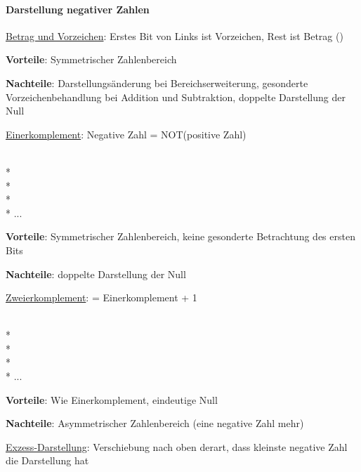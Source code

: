 \paragraph{Darstellung negativer Zahlen}
\begin{enumeration}
	\item \underline{Betrag und Vorzeichen}: Erstes Bit von Links ist Vorzeichen, Rest ist Betrag ()
	\begin{items}
		\item \textbf{Vorteile}: Symmetrischer Zahlenbereich
		\item \textbf{Nachteile}: Darstellungsänderung bei Bereichserweiterung, gesonderte Vorzeichenbehandlung bei Addition und Subtraktion, doppelte Darstellung der Null
	\end{items}

	\item \underline{Einerkomplement}: Negative Zahl = NOT(positive Zahl)
	\begin{center}
		 \quad {} \\*
		 \quad {} \\*
		 \quad {} \\*
		 \quad {} \\*
		...
	\end{center}
	\begin{items}
		\item \textbf{Vorteile}: Symmetrischer Zahlenbereich, keine gesonderte Betrachtung des ersten Bits
		\item \textbf{Nachteile}: doppelte Darstellung der Null
	\end{items}

	\item \underline{Zweierkomplement}: = Einerkomplement + 1
	\begin{center}
		 \quad {} \\*
		 \quad {} \\*
		 \quad {} \\*
		 \quad {} \\*
		...
	\end{center}
	\begin{items}
		\item \textbf{Vorteile}: Wie Einerkomplement, eindeutige Null
		\item \textbf{Nachteile}: Asymmetrischer Zahlenbereich (eine negative Zahl mehr)
	\end{items}

	\item \underline{Exzess-Darstellung}: Verschiebung nach oben derart, dass kleinste negative Zahl die Darstellung  hat
\end{enumeration}

